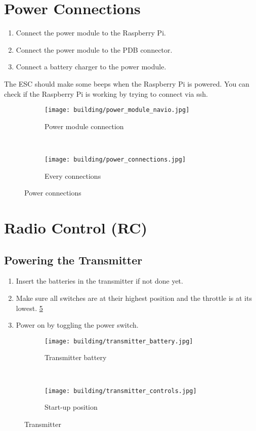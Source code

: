 \section{Power Connections}
\begin{enumerate}
    \item Connect the power module to the Raspberry Pi.
    \item Connect the power module to the PDB connector.
    \item Connect a battery charger to the power module.
\end{enumerate}
The ESC should make some beeps when the Raspberry Pi is powered.
You can check if the Raspberry Pi is working by trying to connect via ssh.

\begin{figure}[!ht]
    \centering
    \begin{subfigure}[b]{0.3\textwidth}
        \texttt{[image: building/power\_module\_navio.jpg]}
        \caption{Power module connection}
        \label{fig:power_module_navio}
    \end{subfigure}
    ~
    \begin{subfigure}[b]{0.3\textwidth}
        \texttt{[image: building/power\_connections.jpg]}
        \caption{Every connections}
        \label{fig:power_connections}
    \end{subfigure}
    \caption{Power connections}\label{fig:power}
\end{figure}

\section{Radio Control (RC)}
\subsection{Powering the Transmitter}
\begin{enumerate}
    \item Insert the batteries in the transmitter if not done yet.
    \item Make sure all switches are at their highest position and the throttle is at its lowest. \ref{fig:transmitter_controls}
    \item Power on by toggling the power switch.
\end{enumerate}

\begin{figure}[!ht]
    \centering
    \begin{subfigure}[b]{0.3\textwidth}
        \texttt{[image: building/transmitter\_battery.jpg]}
        \caption{Transmitter battery}
        \label{fig:transmitter_battery}
    \end{subfigure}
    ~
    \begin{subfigure}[b]{0.3\textwidth}
        \texttt{[image: building/transmitter\_controls.jpg]}
        \caption{Start-up position}
        \label{fig:transmitter_controls}
    \end{subfigure}
    \caption{Transmitter}\label{fig:transmitter}
\end{figure}

